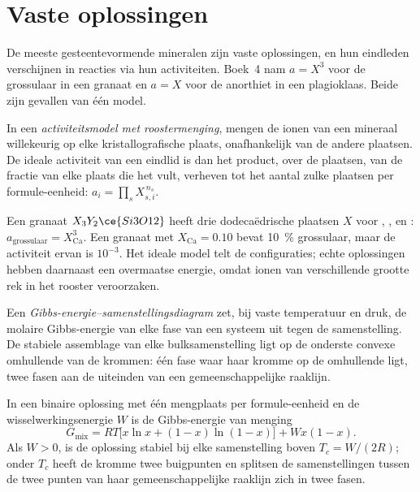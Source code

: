 \section{Vaste oplossingen}\label{sec:b3:petrological-thermodynamics:solutions}

De meeste gesteentevormende mineralen zijn vaste oplossingen, en hun eindleden verschijnen
in reacties via hun activiteiten. Boek~4 nam $a = X^3$ voor
de grossulaar in een granaat en $a = X$ voor de anorthiet in een plagioklaas.
Beide zijn gevallen van één model.

\begin{definition}\label{def:b3:petrological-thermodynamics:site-mixing}
In een \emph{activiteitsmodel met roostermenging}, mengen de
ionen van een mineraal willekeurig op elke kristallografische plaats, onafhankelijk
van de andere plaatsen. De ideale activiteit van een eindlid is dan het product,
over de plaatsen, van de fractie van elke plaats die het vult, verheven tot het aantal
zulke plaatsen per formule-eenheid: $a_i = \prod_s X_{s,i}^{\,n_s}$.
\end{definition}

{\sloppy Een granaat $X_3Y_2\ce{Si3O12}$ heeft drie dodecaëdrische plaatsen $X$ voor
, ,  en : $a_{\text{grossulaar}} =
X_{\text{Ca}}^3$. Een granaat met $X_{\text{Ca}} = 0.10$ bevat
\qty{10}{\percent} grossulaar, maar de activiteit ervan is $10^{-3}$. Het ideale
model telt de configuraties; echte oplossingen hebben daarnaast een overmaatse energie,
omdat ionen van verschillende grootte rek in het rooster veroorzaken.\par}

\begin{definition}\label{def:b3:petrological-thermodynamics:gx}
Een \emph{Gibbs-energie--samenstellingsdiagram}
zet, bij vaste temperatuur en druk, de molaire Gibbs-energie van
elke fase van een systeem uit tegen de samenstelling. De stabiele assemblage van elke
bulksamenstelling ligt op de onderste convexe omhullende van de krommen: één fase
waar haar kromme op de omhullende ligt, twee fasen aan de uiteinden van een gemeenschappelijke raaklijn.
\end{definition}

\begin{proposition}\label{prop:b3:petrological-thermodynamics:regular}
In een binaire oplossing met één mengplaats per formule-eenheid en de
wisselwerkingsenergie $W$ is de Gibbs-energie van menging
\[
  G_{\text{mix}} = RT\bigl[x\ln x + (1 - x)\ln(1 - x)\bigr] + Wx(1 - x).
\]
Als $W > 0$, is de oplossing stabiel bij elke samenstelling boven $T_c =
W/(2R)$; onder $T_c$ heeft de kromme twee buigpunten en splitsen de samenstellingen
tussen de twee punten van haar gemeenschappelijke raaklijn zich in twee fasen.
\end{proposition}

